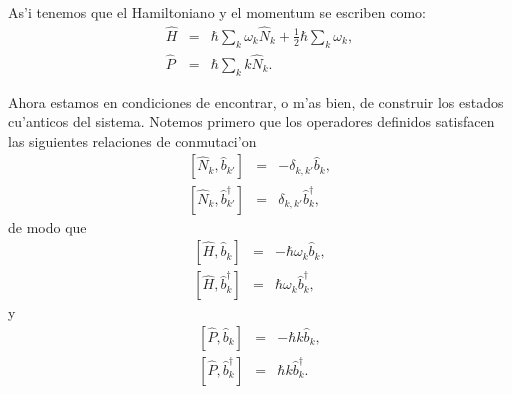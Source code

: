 As'i tenemos que el Hamiltoniano y el momentum se escriben como:
\begin{eqnarray}
\hat{H} & = &\hbar\sum_k \omega_k\hat{N}_k+\frac{1}{2}\hbar\sum_k \omega_k
 ,\\
\hat{P} & = &\hbar\sum_k k\hat{N}_k .
\end{eqnarray}

Ahora estamos en condiciones de encontrar, o m'as bien, de construir los
estados cu'anticos del sistema. Notemos primero que los operadores definidos
satisfacen las siguientes relaciones de conmutaci'on
\begin{eqnarray}
\left[ \hat{N}_k,\hat{b}_{k'}\right] &=&-\delta_{k,k'}\hat{b}_k, \\
\left[ \hat{N}_k,\hat{b}^\dagger _{k'}\right] &=&\delta_{k,k'}\hat{b}^\dagger
_k,
\end{eqnarray}
de modo que
\begin{eqnarray}
\left[ \hat{H},\hat{b}_k\right] &=&-\hbar\omega_k \hat{b}_k, \label{comhb}\\
\left[ \hat{H},\hat{b}^\dagger _k\right] &=&\hbar\omega_k\hat{b}^\dagger _k,
\end{eqnarray}
y
\begin{eqnarray}
\left[ \hat{P},\hat{b}_k\right] &=&-\hbar k \hat{b}_k, \\
\left[ \hat{P},\hat{b}^\dagger _k\right] &=&\hbar k\hat{b}^\dagger _k
\label{compbd}.
\end{eqnarray}

